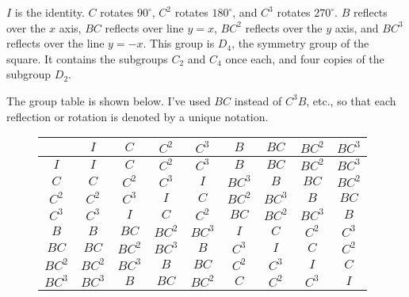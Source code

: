 \documentclass[../textbook.tex]{subfiles}
\begin{document}
\noindent $I$ is the identity. $C$ rotates $90^\circ$, $C^2$ rotates $180^\circ$, and $C^3$ rotates $270^\circ$. $B$ reflects over the $x$ axis, $BC$ reflects over line $y=x$, $BC^2$ reflects over the $y$ axis, and $BC^3$ reflects over the line $y=-x$. This group is $D_4$, the symmetry group of the square. It contains the subgroups $C_2$ and $C_4$ once each, and four copies of the subgroup $D_2$.

The group table is shown below. I've used $BC$ instead of $C^3B$, etc., so that each reflection or rotation is denoted by a unique notation.

\begin{figure}[h]
	\begin{center}
		\begin{minipage}[b]{\textwidth}
			\centering
			\begin{tabular}{c|cccccccc}
				\hline
				& $I$ & $C$ & $C^2$ & $C^3$ & $B$ & $BC$ & $BC^2$ & $BC^3$ \\ \hline
				\rowcolor{light-gray}
				$I$ & $I$ & $C$ & $C^2$ & $C^3$ & $B$ & $BC$ & $BC^2$ & $BC^3$ \\
				$C$ & $C$ & $C^2$ & $C^3$ & $I$ & $BC^3$ & $B$ & $BC$ & $BC^2$ \\
				\rowcolor{light-gray}
				$C^2$ & $C^2$ & $C^3$ & $I$ & $C$ & $BC^2$ & $BC^3$ & $B$ & $BC$ \\
				$C^3$ & $C^3$ & $I$ & $C$ & $C^2$ & $BC$ & $BC^2$ & $BC^3$ & $B$ \\
				\rowcolor{light-gray}
				$B$ & $B$ & $BC$ & $BC^2$ & $BC^3$ & $I$ & $C$ & $C^2$ & $C^3$ \\
				$BC$ & $BC$ & $BC^2$ & $BC^3$ & $B$ & $C^3$ & $I$ & $C$ & $C^2$ \\
				\rowcolor{light-gray}
				$BC^2$ & $BC^2$ & $BC^3$ & $B$ & $BC$ & $C^2$ & $C^3$ & $I$ & $C$ \\
				$BC^3$ & $BC^3$ & $B$ & $BC$ & $BC^2$ & $C$ & $C^2$ & $C^3$ & $I$ \\ \hline
			\end{tabular}
			\vspace*{0.5\baselineskip}
		\end{minipage}
	\end{center}
\end{figure}
\end{document}
